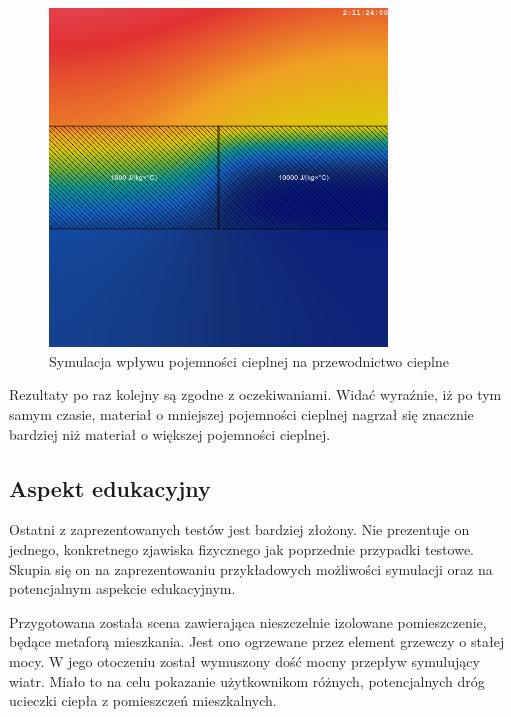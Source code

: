\begin{figure}[!h]
\centering
\includegraphics[width=0.8\textwidth]{img/physics/heatCapacity}
\caption{Symulacja wpływu pojemności cieplnej na przewodnictwo cieplne}
\label{fig:heatCapacity}
\end{figure}

Rezultaty po raz kolejny są zgodne z oczekiwaniami. Widać wyraźnie, iż po tym
samym czasie, materiał o mniejszej pojemności cieplnej nagrzał się znacznie
bardziej niż materiał o większej pojemności cieplnej.

\subsection{Aspekt edukacyjny}

Ostatni z zaprezentowanych testów jest bardziej złożony. Nie prezentuje on
jednego, konkretnego zjawiska fizycznego jak poprzednie przypadki testowe.
Skupia się on na zaprezentowaniu przykładowych możliwości symulacji oraz na
potencjalnym aspekcie edukacyjnym.

Przygotowana została scena zawierająca nieszczelnie izolowane pomieszczenie,
będące metaforą mieszkania. Jest ono ogrzewane przez element grzewczy o stałej
mocy. W jego otoczeniu został wymuszony dość mocny przepływ symulujący wiatr.
Miało to na celu pokazanie użytkownikom różnych, potencjalnych dróg ucieczki
ciepła z pomieszczeń mieszkalnych.

